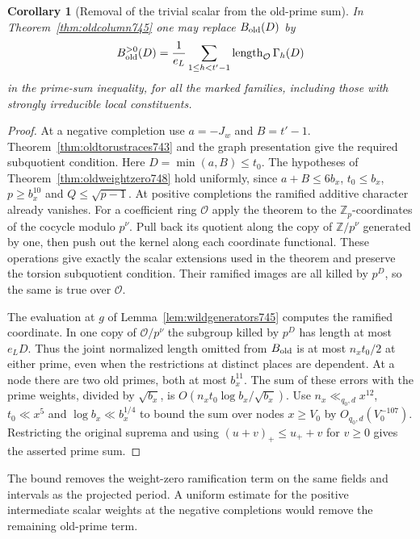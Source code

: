 \documentclass[a4paper,11pt]{article}
\newtheorem{corollary}[proposition]{Corollary}
\theoremstyle{definition}
\theoremstyle{remark}
\numberwithin{equation}{section}
\begin{document}
\begin{corollary}[Removal of the trivial scalar from the old-prime sum]
\leavevmode\label{cor:oldlogperiod748}
In Theorem~\ref{thm:oldcolumn745} one may replace
\(B_{\rm old}(D)\) by
\[
 B_{\rm old}^{>0}(D)=\frac1{e_L}
       \sum_{1\le h<t'-1}\operatorname{length}_{\mathcal O}\Gamma_h(D)
\]
in the prime-sum inequality, for all the marked families,
including those with strongly irreducible local constituents.
\end{corollary}
\begin{proof}
At a negative completion use \(a=-J_w\) and \(B=t'-1\).
Theorem~\ref{thm:oldtorustraces743} and the graph presentation
give the required subquotient condition. Here \(D=\min(a,B)
\le t_0\). The hypotheses of Theorem~\ref{thm:oldweightzero748}
hold uniformly, since \(a+B\le6b_x\), \(t_0\le b_x\),
\(p\ge b_x^{10}\) and \(Q\le\sqrt{p-1}\).
At positive completions the ramified additive character already
vanishes. For a coefficient ring \(\mathcal O\) apply the theorem
to the \(\mathbb Z_p\)-coordinates of the cocycle modulo \(p^\nu\).
Pull back its quotient along the copy of \(\mathbb Z/p^\nu\)
generated by one, then push out the kernel along each coordinate
functional. These operations give exactly the scalar extensions
used in the theorem and preserve the torsion subquotient condition.
Their ramified images are all killed by \(p^D\), so the same is
true over \(\mathcal O\).

The evaluation at \(g\) of Lemma~\ref{lem:wildgenerators745}
computes the ramified coordinate. In one copy of
\(\mathcal O/p^\nu\) the subgroup killed by \(p^D\) has length
at most \(e_L D\). Thus the joint normalized length omitted
from \(B_{\rm old}\) is at most \(n_xt_0/2\) at either prime,
even when the restrictions at distinct places are dependent.
At a node there are two old primes, both at most \(b_x^{11}\).
The sum of these errors with the prime weights, divided by
\(\sqrt{b_x}\), is \(O(n_xt_0\log b_x/\sqrt{b_x})\).
Use \(n_x\ll_{q_0,d}x^{12}\), \(t_0\ll x^5\) and
\(\log b_x\ll b_x^{1/4}\) to bound the sum over nodes \(x\ge V_0\)
by \(O_{q_0,d}(V_0^{-107})\). Restricting the original
suprema and using \((u+v)_+\le u_++v\) for \(v\ge0\)
gives the asserted prime sum.
\end{proof}

The bound removes the weight-zero ramification term on the same
fields and intervals as the projected period. A uniform estimate
for the positive intermediate scalar weights at the negative
completions would remove the remaining old-prime term.
\clearpage
\end{document}
